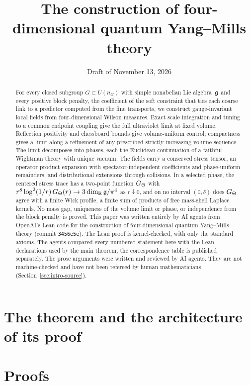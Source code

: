 \documentclass[11pt,letterpaper]{article}
\date{Draft of November 13, 2026}
\title{The construction of four-dimensional quantum Yang--Mills theory}
\author{}
\numberwithin{equation}{section}
\theoremstyle{plain}
\theoremstyle{definition}
\theoremstyle{remark}
\begin{document}
\maketitle
\begin{abstract}
For every closed subgroup $G\subset U(n_G)$ with simple nonabelian Lie algebra~$\mathfrak{g}$ and every positive block penalty, the coefficient of the soft constraint that ties each coarse link to a predictor computed from the fine transports, we construct gauge-invariant local fields from four-dimensional Wilson measures. Exact scale integration and tuning to a common endpoint coupling give the full ultraviolet limit at fixed volume. Reflection positivity and chessboard bounds give volume-uniform control; compactness gives a limit along a refinement of any prescribed strictly increasing volume sequence. The limit decomposes into phases, each the Euclidean continuation of a faithful Wightman theory with unique vacuum. The fields carry a conserved stress tensor, an operator product expansion with spectator-independent coefficients and phase-uniform remainders, and distributional extensions through collisions. In a selected phase, the centered stress trace has a two-point function $G_{\Theta}$ with $r^8\log^2(1/r)\,G_{\Theta}(r)\to3\dim_{\mathbb{R}}\mathfrak{g}/\pi^4$ as $r\downarrow0$, and on no interval $(0,\delta)$ does $G_{\Theta}$ agree with a finite Wick profile, a finite sum of products of free mass-shell Laplace kernels. No mass gap, uniqueness of the volume limit or phase, or independence from the block penalty is proved.
This paper was written entirely by AI agents from OpenAI's Lean code for the construction of four-dimensional quantum Yang--Mills theory (commit \texttt{3456e5e}). The Lean proof is kernel-checked, with only the standard axioms. The agents compared every numbered statement here with the Lean declarations used by the main theorem; the correspondence table is published separately. The prose arguments were written and reviewed by AI agents. They are not machine-checked and have not been refereed by human mathematicians (Section~\ref{sec:intro-source}).
\end{abstract}
\tableofcontents

\part{The theorem and the architecture of its proof}











\part{Proofs}












{\small

}
\end{document}
